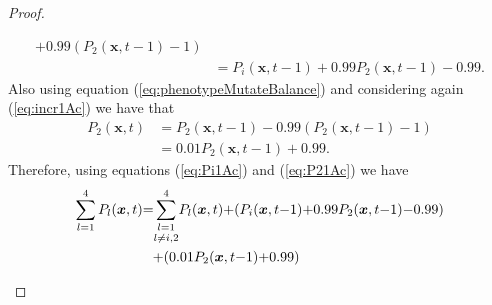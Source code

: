 \documentclass[\main/thesis.tex]{subfiles}
\begin{document}
\begin{proof}
\begin{itemize}
\begin{itemize}
\begin{itemize}
\begin{align*}
                           	                                                  {+} 0.99(P_2(\boldsymbol{x}, t{-}1) {-} 1) \\
                           	                                                 &{=} P_i(\boldsymbol{x}, t{-}1)
                           	                                                  {+} 0.99 P_2(\boldsymbol{x}, t{-}1)
                           	                                                  {-} 0.99.
                           	                          \tag{8}
                           	                          \label{eq:Pi1Ac}
                           	                        \end{align*}
                           	                        Also using equation (\ref{eq:phenotypeMutateBalance}) and considering 
                           	                        again (\ref{eq:incr1Ac}) we have that
                           	                        \begin{align*}
                           	                          P_2(\boldsymbol{x}, t) &{=} P_2(\boldsymbol{x}, t{-}1) 
                           	                                                  {-} 0.99 (P_2(\boldsymbol{x}, t{-}1) {-} 1) \\
                           	                                                 &{=} 0.01 P_2(\boldsymbol{x}, t{-}1)
                           	                                                  {+} 0.99.
                           	                          \tag{9}
                           	                          \label{eq:P21Ac}
                           	                        \end{align*}
                           	                        Therefore, using equations (\ref{eq:Pi1Ac}) and (\ref{eq:P21Ac}) we 
                           	                        have 
                           	                        \begin{align*}
                           	                          \sum_{l{=}1}^4 P_l(\boldsymbol{x}, t) 
                           	                          &{=} \underset{l {\ne} i, 2}{\sum_{l{=}1}^4} P_l(\boldsymbol{x}, t)
                           	                           {+} (P_i(\boldsymbol{x}, t{-} 1) {+} 0.99 P_2(\boldsymbol{x}, t{-}1) 
                           	                           {-} 0.99) \\
                           	                          &\hspace{0.25cm} {+} (0.01 P_2(\boldsymbol{x}, t{-}1) {+} 0.99) \\

\end{align*}
\end{itemize}
\end{itemize}
\end{itemize}
\end{proof}
\end{document}
